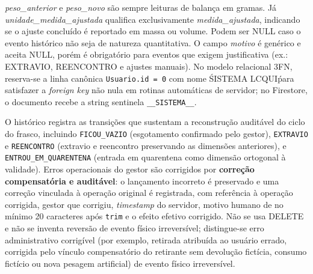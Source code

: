 \begin{explicacao}
\textit{peso\_anterior} e \textit{peso\_novo} são sempre leituras de balança em gramas. Já \textit{unidade\_medida\_ajustada} qualifica exclusivamente \textit{medida\_ajustada}, indicando se o ajuste concluído é reportado em massa ou volume. Podem ser NULL caso o evento histórico não seja de natureza quantitativa. O campo \textit{motivo} é genérico e aceita NULL, porém é obrigatório para eventos que exigem justificativa (ex.: EXTRAVIO, REENCONTRO e ajustes manuais). No modelo relacional 3FN, reserva-se a linha canônica \texttt{Usuario.id = 0} com nome \'SISTEMA LCQUI\' para satisfazer a \textit{foreign key} não nula em rotinas automáticas de servidor; no Firestore, o documento recebe a string sentinela \texttt{\_\_SISTEMA\_\_}.

O histórico registra as transições que sustentam a reconstrução auditável do ciclo do frasco, incluindo \texttt{FICOU\_VAZIO} (esgotamento confirmado pelo gestor), \texttt{EXTRAVIO} e \texttt{REENCONTRO} (extravio e reencontro preservando as dimensões anteriores), e \texttt{ENTROU\_EM\_QUARENTENA} (entrada em quarentena como dimensão ortogonal à validade). Erros operacionais do gestor são corrigidos por \textbf{correção compensatória e auditável}: o lançamento incorreto é preservado e uma correção vinculada à operação original é registrada, com referência à operação corrigida, gestor que corrigiu, \textit{timestamp} do servidor, motivo humano de no mínimo 20 caracteres após \texttt{trim} e o efeito efetivo corrigido. Não se usa DELETE e não se inventa reversão de evento físico irreversível; distingue-se erro administrativo corrigível (por exemplo, retirada atribuída ao usuário errado, corrigida pelo vínculo compensatório do retirante sem devolução fictícia, consumo fictício ou nova pesagem artificial) de evento físico irreversível.
\end{explicacao}

